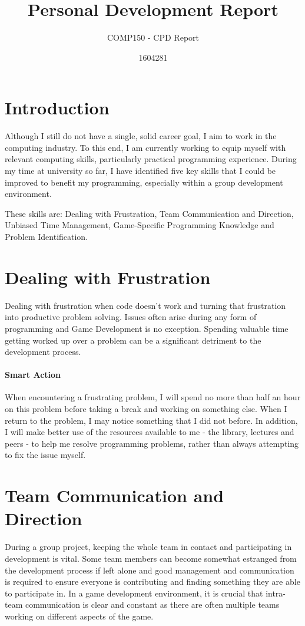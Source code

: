 \documentclass{scrartcl}
\title{Personal Development Report}
\subtitle{COMP150 - CPD Report}
\author{1604281}
\begin{document}
\maketitle

\section{Introduction}

Although I still do not have a single, solid career goal, I aim to work in the computing industry. To this end, I am currently working to equip myself with relevant computing skills, particularly practical programming experience. During my time at university so far, I have identified five key skills that I could be improved to benefit my programming, especially within a group development environment.

These skills are: Dealing with Frustration, Team Communication and Direction, Unbiased Time Management, Game-Specific Programming Knowledge and Problem Identification.

\section{Dealing with Frustration}

Dealing with frustration when code doesn't work and turning that frustration into productive problem solving. Issues often arise during any form of programming and Game Development is no exception. Spending valuable time getting worked up over a problem can be a significant detriment to the development process.

\paragraph{Smart Action} When encountering a frustrating problem, I will spend no more than half an hour on this problem before taking a break and working on something else. When I return to the problem, I may notice something that I did not before. In addition, I will make better use of the resources available to me - the library, lectures and peers - to help me resolve programming problems, rather than always attempting to fix the issue myself.


\section{Team Communication and Direction}

During a group project, keeping the whole team in contact and participating in development is vital. Some team members can become somewhat estranged from the development process if left alone and good management and communication is required to ensure everyone is contributing and finding something they are able to participate in. In a game development environment, it is crucial that intra-team communication is clear and constant as there are often multiple teams working on different aspects of the game. 
\end{document}
